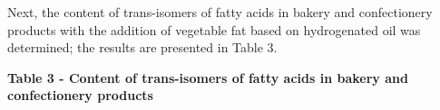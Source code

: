 Next, the content of trans-isomers of fatty acids in bakery and
confectionery products with the addition of vegetable fat based on
hydrogenated oil was determined; the results are presented in Table 3.

{\bfseries Table 3 - Content of trans-isomers of fatty acids in bakery and
confectionery products}


